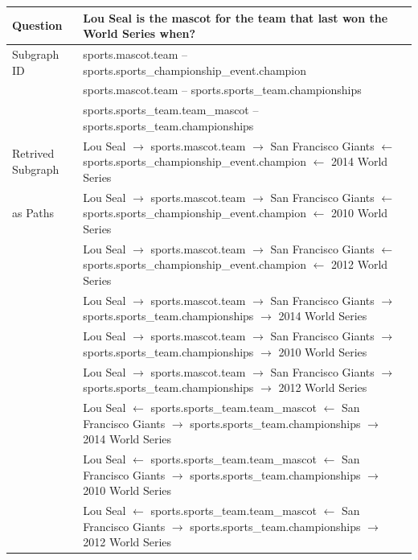 \begin{table}[h]
    \small
    \centering
    \begin{tabular}{lp{11cm}}
    \toprule
        Question & Lou Seal is the mascot for the team that last won the World Series when? \\ \midrule
        Subgraph ID & sports.mascot.team -- sports.sports\_championship\_event.champion\\
        & sports.mascot.team -- sports.sports\_team.championships\\
        & sports.sports\_team.team\_mascot -- sports.sports\_team.championships\\\midrule
        Retrived Subgraph & Lou Seal $\rightarrow$ sports.mascot.team $\rightarrow$ San Francisco Giants $\leftarrow$ sports.sports\_championship\_event.champion $\leftarrow$ 2014 World Series\\
        as Paths & Lou Seal $\rightarrow$ sports.mascot.team $\rightarrow$ San Francisco Giants $\leftarrow$ sports.sports\_championship\_event.champion $\leftarrow$ 2010 World Series\\
        & Lou Seal $\rightarrow$ sports.mascot.team $\rightarrow$ San Francisco Giants $\leftarrow$ sports.sports\_championship\_event.champion $\leftarrow$ 2012 World Series\\
        & Lou Seal $\rightarrow$ sports.mascot.team $\rightarrow$ San Francisco Giants $\rightarrow$ sports.sports\_team.championships $\rightarrow$ 2014 World Series \\
        & Lou Seal $\rightarrow$ sports.mascot.team $\rightarrow$ San Francisco Giants $\rightarrow$ sports.sports\_team.championships $\rightarrow$ 2010 World Series \\
        & Lou Seal $\rightarrow$ sports.mascot.team $\rightarrow$ San Francisco Giants $\rightarrow$ sports.sports\_team.championships $\rightarrow$ 2012 World Series \\
        & Lou Seal $\leftarrow$ sports.sports\_team.team\_mascot $\leftarrow$ San Francisco Giants $\rightarrow$ sports.sports\_team.championships $\rightarrow$ 2014 World Series \\
        & Lou Seal $\leftarrow$ sports.sports\_team.team\_mascot $\leftarrow$ San Francisco Giants $\rightarrow$ sports.sports\_team.championships $\rightarrow$ 2010 World Series \\
        & Lou Seal $\leftarrow$ sports.sports\_team.team\_mascot $\leftarrow$ San Francisco Giants $\rightarrow$ sports.sports\_team.championships $\rightarrow$ 2012 World Series \\

\end{tabular}
\end{table}
